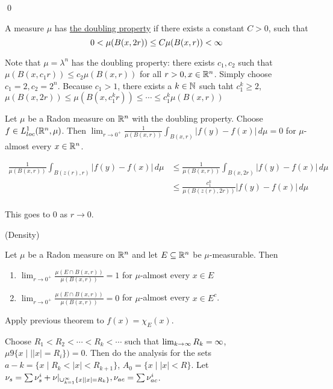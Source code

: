 \documentclass[x11names,reqno,14pt]{extarticle}
\newcommand{\seq}[2][\oo]{_{#2 = 1}^#1}
\newcommand{\cupk}[1][\oo]{\cup\seq[#1]{k}}
\newcommand{\loc}{loc}
\begin{document}
\qed


A measure $\mu$ has \underline{the doubling property} if there exists a constant $C>0$, such that
\[
0< \mu(B(x, 2r)) \leq C\mu(B(x, r)) < \infty
\]

\rem

Note that $\mu = \lambda^n$ has the doubling property: there exists $c_1, c_2$ such that $\mu(B(x, c_1r)) \leq c_2\mu(B(x, r))$ for all $r > 0, x \in \mathbb{R}^n$. Simply choose $c_1 = 2, c_2 = 2^n$. Because $c_1 > 1$, there exists a $k\in\mathbb{N}$ such taht $c_1^k\geq2$, $\mu(B(x, 2r)) \leq \mu(B(x, c_1^kr)) \leq \cdots \leq c_1^k\mu(B(x, r))$

\thm Let $\mu$ be a Radon measure on $\mathbb{R}^n$ with the doubling property. Choose $f \in L^1_{\loc}(\R^n,\mu)$. Then $\lim_{r\to0^+}\frac{1}{\mu(B(x, r))}\int_{B(x, r)}|f(y) - f(x)|\,d\mu = 0$ for $\mu$-almost every $x \in \mathbb{R}^n$. 

\proof

\begin{align*}
\frac{1}{\mu(B(x, r))}\int_{B(z(r), r)}|f(y) - f(x)|\,d\mu & \leq \frac{1}{\mu(B(x, r))}\int_{B(x, 2r)}|f(y) - f(x)|\,d\mu \\
& \leq \frac{c_1^k}{\mu(B(z(r), 2r))}|f(y) - f(x)|\,d\mu \\
\end{align*}

This goes to 0 as $r\to 0$. 

\thm (Density)

Let $\mu$ be a Radon measure on $\mathbb{R}^n$ and let $E \subseteq \mathbb{R}^n$ be $\mu$-measurable. Then
\begin{enumerate}

\item $\lim_{r\to0^+}\frac{\mu(E \cap B(x, r))}{\mu(B(x, r))} = 1$ for $\mu$-almost every $x \in E$
\item $\lim_{r\to0^+}\frac{\mu(E \cap B(x, r))}{\mu(B(x, r))} = 0$ for $\mu$-almost every $x \in E^c$.

\end{enumerate}

\proof

Apply previous theorem to $f(x) = \chi_{E}(x)$.

Choose $R_1 < R_2 < \cdots < R_k < \cdots$ such that $\lim_{k\to\infty}R_k = \infty$, $\mu9\{x\mid||x| = R_i\}) = 0$. Then do the analysis for the sets $a-k = \{x\mid R_k < |x| < R_{k + 1}\}$, $A_0 = \{x\mid |x| < R\}$. Let $\nu_s = \sum\nu_s^i + \nu|_{\cupk\{x\mid |x| = R_k\}}, \nu_{ac} =\sum\nu_{ac}^i$. 
\end{document}
